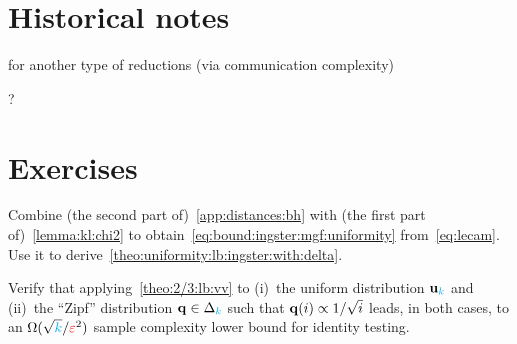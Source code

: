 \section{Historical notes}
\tbc
\citet{BlaisCG17} for another type of reductions (via communication complexity)

?

\section{Exercises}
\begin{question}\label{exo:deriving:dep:delta:lb}
Combine (the second part of)~\cref{app:distances:bh} with (the first part of)~\cref{lemma:kl:chi2} to obtain~\cref{eq:bound:ingster:mgf:uniformity} from~\cref{eq:lecam}. Use it to derive~\cref{theo:uniformity:lb:ingster:with:delta}.
\end{question}

\begin{question}\label{ex:2/3:lb:applications}
Verify that applying~\cref{theo:2/3:lb:vv} to (i)~the uniform distribution $\mathbf{u}_{\textcolor{cyan}{k}}$ and (ii)~the ``Zipf'' distribution $\mathbf{q}\in\Delta_{{\textcolor{cyan}{k}}}$ such that $\mathbf{q}(i) \propto 1/\sqrt{i}$ leads, in both cases, to an $\Omega(\sqrt{{\textcolor{cyan}{k}}}/\textcolor{red}{\varepsilon}^2)$ sample complexity lower bound for identity testing.
\end{question}

